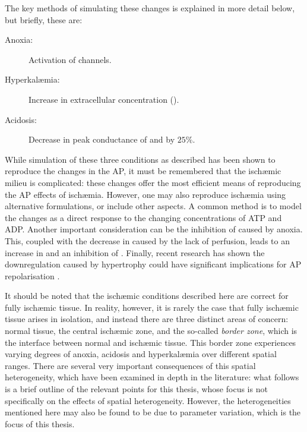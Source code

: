 \documentclass[../thesis-main.tex]{subfiles}
\begin{document}
The key methods of simulating these changes is explained in more detail below, but briefly, these are:
\begin{description}
 \item[Anoxia:] Activation of \ikatp{} channels.
 \item[Hyperkal\ae{}mia:] Increase in extracellular \K{} concentration (\ko{}).
 \item[Acidosis:] Decrease in peak conductance of \ina{} and \ica{} by $25\%$.
\end{description}
While simulation of these three conditions as described has been shown to reproduce the changes in the AP, it must be remembered that the isch\ae{}mic milieu is complicated: these changes offer the most efficient means of reproducing the AP effects of isch\ae{}mia. However, one may also reproduce isch\ae{}mia using alternative formulations, or include other aspects. A common method is to model the changes as a direct response to the changing concentrations of ATP and ADP. Another important consideration can be the inhibition of \inak{} caused by anoxia. This, coupled with the decrease in \nao{} caused by the lack of perfusion, leads to an increase in \nai{} and an inhibition of \inaca{}. Finally, recent research has shown the \ito{} downregulation caused by hypertrophy could have significant implications for AP repolarisation \citep{Verkerk2011}.

It should be noted that the isch\ae{}mic conditions described here are correct for fully isch\ae{}mic tissue. In reality, however, it is rarely the case that fully isch\ae{}mic tissue arises in isolation, and instead there are three distinct areas of concern: normal tissue, the central isch\ae{}mic zone, and the so-called \emph{border zone}, which is the interface between normal and isch\ae{}mic tissue. This border zone experiences varying degrees of anoxia, acidosis and hyperkal\ae{}mia over different spatial ranges. There are several very important consequences of this spatial heterogeneity, which have been examined in depth in the literature: what follows is a brief outline of the relevant points for this thesis, whose focus is not specifically on the effects of spatial heterogeneity. However, the heterogeneities mentioned here may also be found to be due to parameter variation, which is the focus of this thesis.
\end{document}
